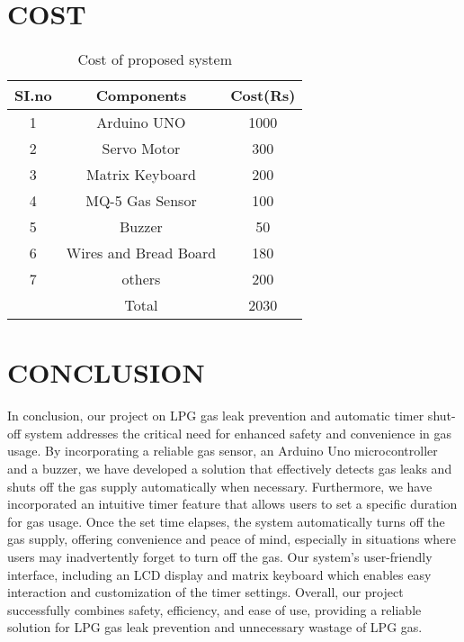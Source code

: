 \documentclass[a4paper,12pt]{report}
\begin{document}
\begin{}
{\begin{table}
    \chapter{COST}
    \centering
    \begin{tabular}{|c|c|c|}
    \hline
    SI.no & Components & Cost(Rs)\\
    \hline
    1 & Arduino UNO & 1000 \\
    \hline
    2 & Servo Motor & 300\\
    \hline
    3 & Matrix Keyboard & 200\\
    \hline
    4 & MQ-5 Gas Sensor & 100\\
    \hline
    5 & Buzzer &50\\
    \hline
    6 & Wires and Bread Board & 180\\
    \hline
    7 & others & 200\\
    \hline
    & Total & 2030\\
    \hline
    
    \end{tabular}
    \caption{Cost of proposed system}
    \label{tab:my_label}
\end{table}
}
\chapter{CONCLUSION}

In conclusion, our project on LPG gas leak prevention and automatic timer shut-off system
addresses the critical need for enhanced safety and convenience in gas usage. By incorporating a
reliable gas sensor, an Arduino Uno microcontroller and a buzzer, we have developed a solution
that effectively detects gas leaks and shuts off the gas supply automatically when necessary.
Furthermore, we have incorporated an intuitive timer feature that allows users to set a specific
duration for gas usage. Once the set time elapses, the system automatically turns off the gas supply,
offering convenience and peace of mind, especially in situations where users may inadvertently
forget to turn off the gas.
Our system's user-friendly interface, including an LCD display and matrix keyboard which
enables easy interaction and customization of the timer settings.
Overall, our project successfully combines safety, efficiency, and ease of use, providing a reliable
solution for LPG gas leak prevention and unnecessary wastage of LPG gas.

\newpage
\renewcommand{\bibname}{\uppercase{REFERENCES}}
\begin{thebibliography}{999}



\end{thebibliography}
\end{}
\end{document}
